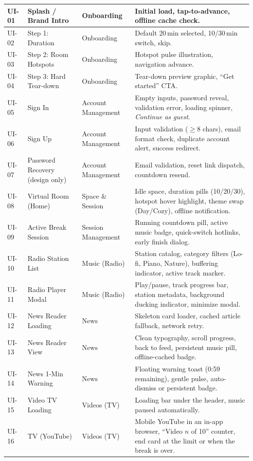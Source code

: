 \begin{longtable}{|p{1.2cm}|p{3.2cm}|p{3.8cm}|p{6.4cm}|}
UI-01 & Splash / Brand Intro & Onboarding & Initial load, tap-to-advance, offline cache check. \\ \hline
UI-02 & Step 1: Duration & Onboarding & Default 20\,min selected, 10/30\,min switch, skip. \\ \hline
UI-03 & Step 2: Room Hotspots & Onboarding & Hotspot pulse illustration, navigation advance. \\ \hline
UI-04 & Step 3: Hard Tear-down & Onboarding & Tear-down preview graphic, ``Get started'' CTA. \\ \hline
UI-05 & Sign In & Account Management & Empty inputs, password reveal, validation error, loading spinner, \textit{Continue as guest}. \\ \hline
UI-06 & Sign Up & Account Management & Input validation ($\ge 8$ chars), email format check, duplicate account alert, success redirect. \\ \hline
UI-07 & Password Recovery (design only) & Account Management & Email validation, reset link dispatch, countdown resend. \\ \hline
UI-08 & Virtual Room (Home) & Space \& Session & Idle space, duration pills (10/20/30), hotspot hover highlight, theme swap (Day/Cozy), offline notification. \\ \hline
UI-09 & Active Break Session & Session Management & Running countdown pill, active music badge, quick-switch hotlinks, early finish dialog. \\ \hline
UI-10 & Radio Station List & Music (Radio) & Station catalog, category filters (Lo-fi, Piano, Nature), buffering indicator, active track marker. \\ \hline
UI-11 & Radio Player Modal & Music (Radio) & Play/pause, track progress bar, station metadata, background ducking indicator, minimize modal. \\ \hline
UI-12 & News Reader Loading & News & Skeleton card loader, cached article fallback, network retry. \\ \hline
UI-13 & News Reader View & News & Clean typography, scroll progress, back to feed, persistent music pill, offline-cached badge. \\ \hline
UI-14 & News 1-Min Warning & News & Floating warning toast (0:59 remaining), gentle pulse, auto-dismiss or persistent badge. \\ \hline
UI-15 & Video TV Loading & Videos (TV) & Loading bar under the header, music paused automatically. \\ \hline
UI-16 & TV (YouTube) & Videos (TV) & Mobile YouTube in an in-app browser, ``Video $n$ of 10'' counter, end card at the limit or when the break is over. \\ \hline

\end{longtable}
